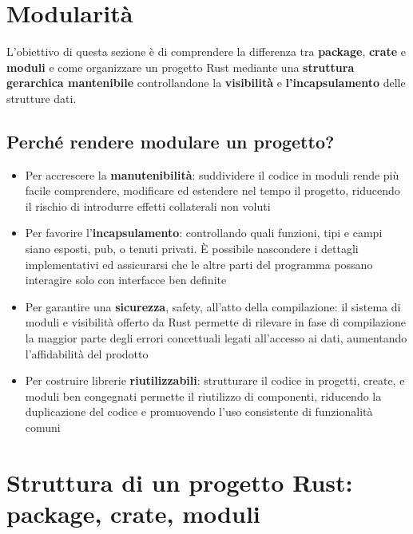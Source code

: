 \section{Modularità}
L'obiettivo di questa sezione è di comprendere la differenza tra
\textbf{package}, \textbf{crate} e \textbf{moduli} e come organizzare un
progetto Rust mediante una \textbf{struttura gerarchica mantenibile}
controllandone la \textbf{visibilità} e \textbf{l'incapsulamento} delle
strutture dati.


\subsection{Perché rendere modulare un progetto?}

\begin{itemize}
  \item Per accrescere la \textbf{manutenibilità}: suddividere il
        codice in moduli rende più facile comprendere, modificare ed estendere
        nel tempo il progetto, riducendo il rischio di introdurre effetti
        collaterali non voluti
  \item Per favorire l'\textbf{incapsulamento}: controllando quali
        funzioni, tipi e campi siano esposti, pub, o tenuti privati. È possibile
        nascondere i dettagli implementativi ed assicurarsi che le altre
        parti del programma possano interagire solo con interfacce ben definite
  \item Per garantire una \textbf{sicurezza}, safety, all'atto della
        compilazione: il sistema di moduli e visibilità offerto da Rust permette
        di rilevare in fase di compilazione la maggior parte degli errori
        concettuali legati all'accesso ai dati, aumentando l'affidabilità del prodotto
  \item Per costruire librerie \textbf{riutilizzabili}: strutturare il
        codice in progetti, create, e moduli ben congegnati permette il riutilizzo
        di componenti, riducendo la duplicazione del codice e promuovendo
        l'uso consistente di funzionalità comuni
\end{itemize}


\section{Struttura di un progetto Rust: package, crate, moduli}

